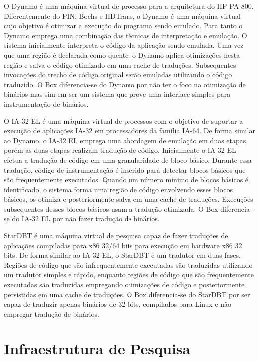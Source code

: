 \documentclass[11pt,twoside]{article}
\begin{document}
O Dynamo \cite{Bala2000} é uma máquina virtual de processo para a arquitetura do HP PA-800. 
Diferentemente do PIN, Bochs e HDTrans, o Dynamo é uma máquina virtual cujo objetivo é otimizar a execução do programa sendo emulado.
Para tanto o Dynamo emprega uma combinação das técnicas de interpretação e emulação. 
O sistema inicialmente interpreta o código da aplicação sendo emulada. 
Uma vez que uma região é declarada como quente, o Dynamo aplica otimizações nesta região e salva o código otimizado em uma cache de traduções. 
Subsequentes invocações do trecho de código original serão emuladas utilizando o código traduzido. 
O Box diferencia-se do Dynamo por não ter o foco na otimização de binários mas sim em ser um sistema que prove uma interface simples para 
instrumentação de binários.

O IA-32 EL \cite{Baraz2003} é uma máquina virtual de processos com o objetivo de suportar a execução de aplicações IA-32 em processadores da família IA-64.
De forma similar ao Dynamo, o IA-32 EL emprega uma abordagem de emulação em duas etapas, porém as duas etapas realizam tradução de código. 
Inicialmente o IA-32 EL efetua a tradução de código em uma granularidade de bloco básico.
Durante essa tradução, código de instrumentação é inserido para detectar blocos básicos que são frequentemente executados. 
Quando um número mínimo de blocos básicos é identificado, o sistema forma uma região de código envolvendo esses blocos básicos, os otimiza e posteriormente salva em uma cache de traduções. 
Execuções subsequentes desses blocos básicos usam a tradução otimizada. 
O Box diferencia-se do IA-32 EL por não fazer tradução de binários.

StarDBT \cite{Wang2007} é uma máquina virtual de pesquisa capaz de fazer traduções de aplicações compiladas para x86 32/64 bits para execução em hardware x86 32 bits.
De forma similar ao IA-32 EL, o StarDBT é um tradutor em duas fases. 
Regiões de código que são infrequentemente executadas são traduzidas utilizando um tradutor simples e rápido, enquanto regiões de código que são frequentemente executadas são traduzidas empregando otimizações de código e posteriormente persistidas em uma cache de traduções. 
O Box diferencia-se do StarDBT por ser capaz de traduzir apenas binários de 32 bits, compilados para Linux e não empregar tradução de binários.





\section{Infraestrutura de Pesquisa} \label{sec:infraestrutura}
\end{document}
